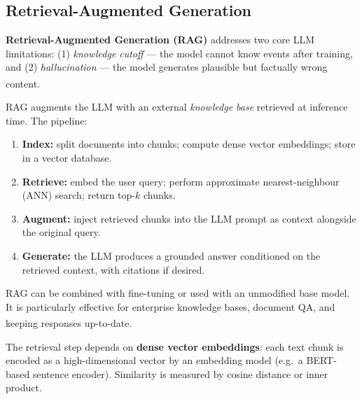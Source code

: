 \subsection{Retrieval-Augmented Generation}

\begin{tcbitemize}[ skin=sectionraster ]

    \tcbitem[title={RAG: Motivation and Pipeline}, raster multicolumn=6]
    \textbf{Retrieval-Augmented Generation (RAG)} addresses two core LLM limitations:
    (1) \emph{knowledge cutoff} --- the model cannot know events after training, and
    (2) \emph{hallucination} --- the model generates plausible but factually wrong
    content.\textsuperscript{\cite[][p.~82]{farrisHowLargeLanguage2025}}

    RAG augments the LLM with an external \emph{knowledge base} retrieved at inference
    time. The pipeline:

    \begin{enumerate}
        \item \textbf{Index:} split documents into chunks; compute dense vector
              embeddings; store in a vector database.
        \item \textbf{Retrieve:} embed the user query; perform approximate
              nearest-neighbour (ANN) search; return top-$k$ chunks.
        \item \textbf{Augment:} inject retrieved chunks into the LLM prompt as context
              alongside the original query.
        \item \textbf{Generate:} the LLM produces a grounded answer conditioned on the
              retrieved context, with citations if desired.
    \end{enumerate}

    RAG can be combined with fine-tuning or used with an unmodified base model. It is
    particularly effective for enterprise knowledge bases, document QA, and keeping
    responses up-to-date.\textsuperscript{\cite[][p.~83]{farrisHowLargeLanguage2025}}

    \tcbitem[title={Vector Databases and Chunking}, raster multicolumn=6]
    The retrieval step depends on \textbf{dense vector embeddings}: each text chunk is
    encoded as a high-dimensional vector by an embedding model (e.g.\ a BERT-based
    sentence encoder). Similarity is measured by cosine distance or inner product.


\end{tcbitemize}
